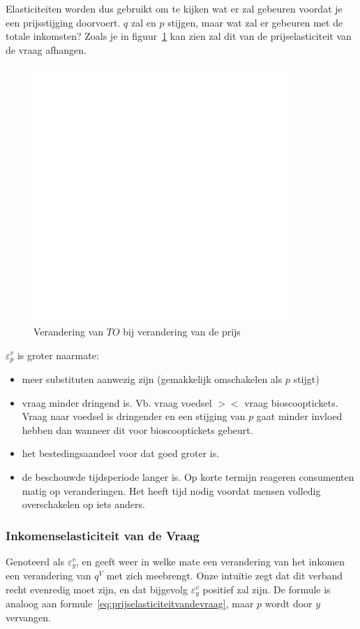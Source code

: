 Elasticiteiten worden dus gebruikt om te kijken wat er zal gebeuren voordat je een prijsstijging doorvoert. $q$ zal en $p$ stijgen, maar wat zal er gebeuren met de totale inkomsten? Zoals je in figuur~\ref{fig:prijsveranderingelasticiteiten} kan zien zal dit van de prijselasticiteit van de vraag afhangen.
\begin{figure}[htbp]
	\centering
	\includegraphics[scale=0.4]{Images/white.png}
	\caption{Verandering van $TO$ bij verandering van de prijs}
	\label{fig:prijsveranderingelasticiteiten}
\end{figure}

$\varepsilon^{v}_{p}$ is groter naarmate:
\begin{itemize}
	\item meer substituten aanwezig zijn (gemakkelijk omschakelen als $p$ stijgt)
    \item vraag minder dringend is. Vb. vraag voedsel $><$ vraag bioscooptickets. Vraag naar voedsel is dringender en een stijging van $p$ gaat minder invloed hebben dan wanneer dit voor bioscooptickets gebeurt.
    \item het bestedingsaandeel voor dat goed groter is.
    \item de beschouwde tijdsperiode langer is. Op korte termijn reageren consumenten matig op veranderingen. Het heeft tijd nodig voordat mensen volledig overschakelen op iets anders.
\end{itemize}



\subsubsection{Inkomenselasticiteit van de Vraag}
Genoteerd als $\varepsilon^{v}_{y}$, en geeft weer in welke mate een verandering van het inkomen een verandering van $q^V$ met zich meebrengt. Onze intu\"itie zegt dat dit verband recht evenredig moet zijn, en dat bijgevolg $\varepsilon^{v}_{y}$ positief zal zijn. De formule is analoog aan formule~\ref{eq:prijselasticiteitvandevraag}, maar $p$ wordt door $y$ vervangen.

